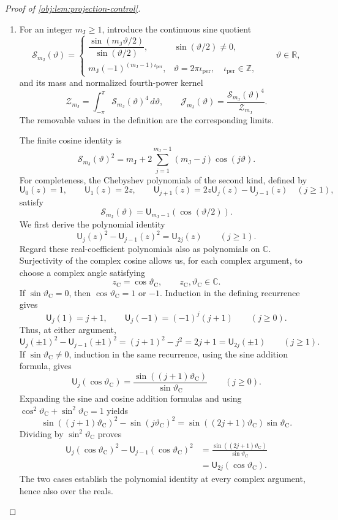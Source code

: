 \begin{proof}[Proof of \cref{obj:lem:projection-control}]
\begin{enumerate}
\item For an integer \(m_{\mathrm J}\ge1\), introduce the continuous sine quotient
\[
\mathcal S_{m_{\mathrm J}}(\vartheta)
=
\begin{cases}
\dfrac{\sin(m_{\mathrm J}\vartheta/2)}{\sin(\vartheta/2)},
   &\sin(\vartheta/2)\ne0,\\[6pt]
m_{\mathrm J}(-1)^{(m_{\mathrm J}-1)\iota_{\mathrm{per}}},
   &\vartheta=2\pi\iota_{\mathrm{per}},\quad \iota_{\mathrm{per}}\in\mathbb Z,
\end{cases}
\qquad \vartheta\in\mathbb R,
\]
and its mass and normalized fourth-power kernel
\[
\mathcal Z_{m_{\mathrm J}}
=\int_{-\pi}^{\pi}\mathcal S_{m_{\mathrm J}}(\vartheta)^4\,d\vartheta,
\qquad
\mathcal J_{m_{\mathrm J}}(\vartheta)
=\frac{\mathcal S_{m_{\mathrm J}}(\vartheta)^4}{\mathcal Z_{m_{\mathrm J}}}.
\]
The removable values in the definition are the corresponding limits.

The finite cosine identity is
\[
\mathcal S_{m_{\mathrm J}}(\vartheta)^2
=m_{\mathrm J}
 +2\sum_{j=1}^{m_{\mathrm J}-1}(m_{\mathrm J}-j)\cos(j\vartheta).
\]
For completeness, the Chebyshev polynomials of the second kind, defined by
\[
\mathsf U_0(z)=1,\qquad
\mathsf U_1(z)=2z,\qquad
\mathsf U_{j+1}(z)=2z\mathsf U_j(z)-\mathsf U_{j-1}(z)
\quad(j\ge1),
\]
satisfy
\[
\mathcal S_{m_{\mathrm J}}(\vartheta)
=\mathsf U_{m_{\mathrm J}-1}(\cos(\vartheta/2)).
\]
We first derive the polynomial identity
\[
\mathsf U_j(z)^2-\mathsf U_{j-1}(z)^2=\mathsf U_{2j}(z)
\qquad(j\ge1).
\]
Regard these real-coefficient polynomials also as polynomials on \(\mathbb C\). Surjectivity of the complex cosine allows us, for each complex argument, to choose a complex angle satisfying
\[
z_{\mathrm C}=\cos\vartheta_{\mathrm C},
\qquad z_{\mathrm C},\vartheta_{\mathrm C}\in\mathbb C.
\]
If \(\sin\vartheta_{\mathrm C}=0\), then \(\cos\vartheta_{\mathrm C}=1\) or \(-1\). Induction in the defining recurrence gives
\[
\mathsf U_j(1)=j+1,
\qquad
\mathsf U_j(-1)=(-1)^j(j+1)
\qquad(j\ge0).
\]
Thus, at either argument,
\[
\mathsf U_j(\pm1)^2-\mathsf U_{j-1}(\pm1)^2
=(j+1)^2-j^2=2j+1=\mathsf U_{2j}(\pm1)
\qquad(j\ge1).
\]
If \(\sin\vartheta_{\mathrm C}\ne0\), induction in the same recurrence, using the sine addition formula, gives
\[
\mathsf U_j(\cos\vartheta_{\mathrm C})
=\frac{\sin((j+1)\vartheta_{\mathrm C})}
       {\sin\vartheta_{\mathrm C}}
\qquad(j\ge0).
\]
Expanding the sine and cosine addition formulas and using
\(\cos^2\vartheta_{\mathrm C}+\sin^2\vartheta_{\mathrm C}=1\) yields
\[
\sin((j+1)\vartheta_{\mathrm C})^2
-\sin(j\vartheta_{\mathrm C})^2
=\sin((2j+1)\vartheta_{\mathrm C})
 \sin\vartheta_{\mathrm C}.
\]
Dividing by \(\sin^2\vartheta_{\mathrm C}\) proves
\[
\begin{aligned}
\mathsf U_j(\cos\vartheta_{\mathrm C})^2
-\mathsf U_{j-1}(\cos\vartheta_{\mathrm C})^2
&=\frac{\sin((2j+1)\vartheta_{\mathrm C})}
        {\sin\vartheta_{\mathrm C}}\\
&=\mathsf U_{2j}(\cos\vartheta_{\mathrm C}).
\end{aligned}
\]
The two cases establish the polynomial identity at every complex argument, hence also over the reals.


\end{enumerate}
\end{proof}
